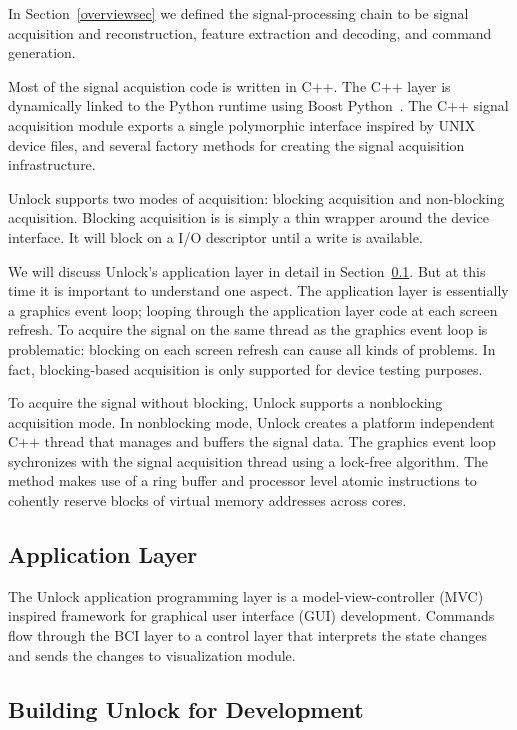 \documentclass[11pt]{article}
\begin{document}
In Section~\ref{overviewsec} we defined the signal-processing chain to be signal acquisition and reconstruction, feature extraction and decoding, and command generation.

Most of the signal acquistion code is written in C++.  The C++ layer is dynamically linked to the Python runtime using Boost Python~\cite{boostpython}.  The C++ signal acquisition module exports a single polymorphic interface inspired by UNIX device files, and several factory methods for creating the signal acquisition infrastructure.

Unlock supports two modes of acquisition: blocking acquisition and non-blocking acquisition.  Blocking acquisition is is simply a thin wrapper around the device interface.  It will block on a I/O descriptor until a write is available.

We will discuss Unlock's application layer in detail in Section~\ref{applicationsec}.  But at this time it is important to understand one aspect.  The application layer is essentially a graphics event loop; looping through the application layer code at each screen refresh.  To acquire the signal on the same thread as the graphics event loop is problematic: blocking on each screen refresh can cause all kinds of problems.  In fact, blocking-based acquisition is only supported for device testing purposes. 

To acquire the signal without blocking, Unlock supports a nonblocking acquisition mode.  In nonblocking mode, Unlock creates a platform independent C++ thread that manages and buffers the signal data.  The graphics event loop sychronizes with the signal acquisition thread using a lock-free algorithm.  The method makes use of a ring buffer and processor level atomic instructions to cohently reserve blocks of virtual memory addresses across cores.

\subsection{Application Layer}\label{applicationsec}

The Unlock application programming layer is a model-view-controller (MVC)~\cite{mvc, mvc2} inspired framework for graphical user interface (GUI) development.  Commands flow through the BCI layer to a control layer that interprets the state changes and sends the changes to visualization module.

\subsection{Building Unlock for Development}
\end{document}
